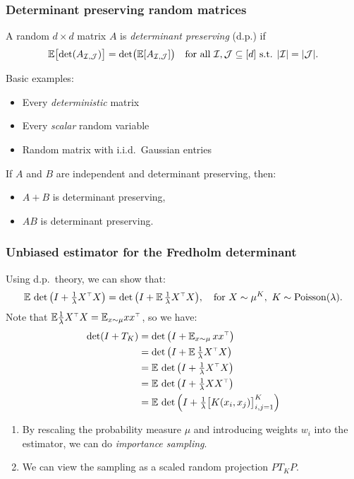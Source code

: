 \documentclass[10pt]{beamer}
\begin{document}
\begin{frame}
  \frametitle{Determinant preserving random matrices}
\begin{definition}
A random $d\times d$ matrix $A$ is \emph{determinant preserving} (d.p.) if
\begin{align*}
  \mathbb E\big[\!\det(A_{\mathcal I,\mathcal{J}})\big] =
  \det\!\big(\mathbb E[A_{\mathcal I,\mathcal{J}}]\big)\quad \text{for all }\mathcal I,\mathcal{J}\subseteq
  [d]\text{ s.t. }|\mathcal I|=|\mathcal{J}|.
\end{align*}
\vspace{-7mm}
\end{definition}

Basic examples:
\begin{itemize}
\item Every \textit{deterministic} matrix
\item Every \textit{scalar} random variable
\item Random matrix with i.i.d.~Gaussian entries
\end{itemize}
\vspace{3mm}
  \begin{lemma}[Closure]
  If $A$ and $B$ are independent and determinant preserving, then:
  \begin{itemize}
  \item $A+B$ is determinant preserving,
  \item $AB$ is determinant preserving.
    \end{itemize}
  \end{lemma}
\end{frame}

\begin{frame}
\frametitle{Unbiased estimator for the Fredholm determinant}
Using d.p.~theory, we can show that:
\begin{align*}
\E\,\det\big(I+\tfrac1\lambda X^\top X\big)
  = \det\big(I+\E\,\tfrac1\lambda X^\top X\big),
  \quad\text{for } X\sim\mu^K,\  K\sim\Poisson(\lambda). 
\end{align*}
Note that $\E\frac1\lambda X^\top X = \E_{x\sim\mu}xx^\top$, so we
have:
\begin{align*}
  \det(I+T_K)
  &=\det\big(I + \E_{x\sim\mu}\,xx^\top\big)
  \\
  &=\det\big(I+\E\,\tfrac1\lambda X^\top X\big)
  \\
  &=\E\,\det\big(I+\tfrac1\lambda X^\top X\big)
  \\
  &=\E\,\det\big(I+\tfrac1\lambda X X^\top\big)
  \\
   &=\E\,\det\Big(I+\tfrac1\lambda \big[K(x_i,x_j)\big]_{i,j=1}^K\Big)
\end{align*}
\begin{enumerate}
  \item By rescaling the probability measure $\mu$ and
introducing weights $w_i$ into the estimator, we can do
\textit{importance sampling}.
\item We can view the sampling as a scaled random projection $P T_K
  P$. 
\end{enumerate}
\end{frame}
\end{document}
